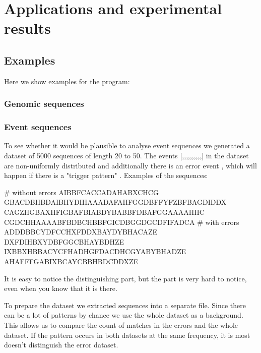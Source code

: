\chapter{Applications and experimental results}
\label{c:results}

\WIP

\section{Examples}

Here we show examples for the program:

\subsection{Genomic sequences}


\subsection{Event sequences}

To see whether it would be plausible to analyse event sequences we generated a dataset of 5000 sequences of length 20 to 50. The events [,,,,,,,,,,] in the dataset are non-uniformly distributed and additionally there is an error event , which will happen if there is a "trigger pattern" . Examples of the sequences:

\begin{file}
# without errors
AIBBFCACCADAHABXCHCG
GBACDBHBDAIBHYDIHAAADAFAHFGGDBFFYFZBFBAGDIDDX
CAGZHGBAXHFIGBAFBIABDYBABBFDBAFGGAAAAHHC
CGDCHHAAAABFBDBCHBBFGICDBGGDGCDFIFADCA
# with errors
ADDDBBCYDFCCHXFDDXBAYDYBHACAZE
DXFDIHBXYDBFGGCBHAYBDHZE
IXBBXHBBACYCFHADHGFDACDHCGYABYBHADZE
AHAFFFGABIXBCAYCBBHBDCDDXZE
\end{file}

It is easy to notice the distinguishing  part, but the  part is very hard to notice, even when you know that it is there.

To prepare the dataset we extracted sequences into a separate file. Since there can be a lot of patterns by chance we use the whole dataset as a background. This allows us to compare the count of matches in the errors and the whole dataset. If the pattern occurs in both datasets at the same frequency, it is most doesn't distinguish the error dataset.

